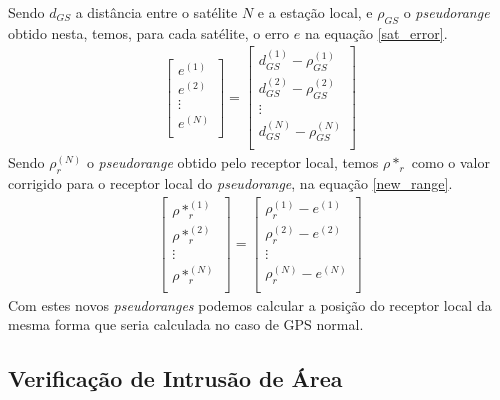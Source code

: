 \documentclass{article}
\begin{document}
Sendo $d_{GS}$ a distância entre o satélite $N$ e a
estação local, e $\rho_{GS}$ o \textit{pseudorange} obtido nesta, temos,
para cada satélite, o erro $e$ na equação \ref{sat_error}.
\begin{gather} \label{sat_error}
	\left[\begin{matrix}
		e^{(1)} \\
        e^{(2)} \\
        \vdots \\
        e^{(N)} \\
	\end{matrix}\right]
	= \left[\begin{matrix}
		d^{(1)}_{GS} - \rho^{(1)}_{GS} \\
        d^{(2)}_{GS} - \rho^{(2)}_{GS} \\
        \vdots \\
        d^{(N)}_{GS} - \rho^{(N)}_{GS} \\
	\end{matrix}\right]
\end{gather}
Sendo $\rho^{(N)}_{r}$ o \textit{pseudorange} obtido pelo receptor local, temos $\rho*_r $ como o valor corrigido para o receptor local do \textit{pseudorange}, na equação \ref{new_range}.
\begin{gather} \label{new_range}
	\left[\begin{matrix}
		\rho*^{(1)}_r \\
        \rho*^{(2)}_r \\
        \vdots \\
        \rho*^{(N)}_r \\
	\end{matrix}\right]
	= \left[\begin{matrix}
		\rho^{(1)}_{r} - e^{(1)} \\
        \rho^{(2)}_{r} - e^{(2)} \\
        \vdots \\
        \rho^{(N)}_{r} - e^{(N)} \\
	\end{matrix}\right]
\end{gather}
Com estes novos \textit{pseudoranges} podemos calcular a posição do receptor local da mesma forma que seria calculada no caso de GPS normal.

\subsection{Verificação de Intrusão de Área}
\end{document}
